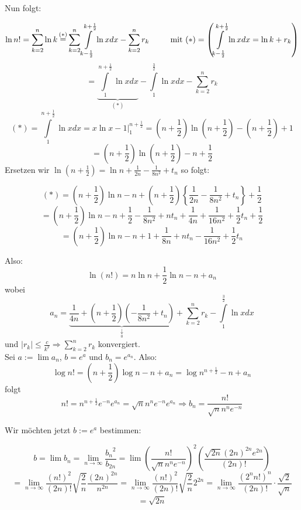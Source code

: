 Nun folgt:

\[\ln n! = \sum\limits_{k = 2}^n {\ln k\mathop  = \limits^{( * )} \sum\limits_{k = 2}^n {\int\limits_{k - \frac{1}{2}}^{k + \frac{1}{2}} {\ln xdx} }  - \sum\limits_{k = 2}^n {{r_k}} } \text{\hspace{8mm} mit }( * )=\left( {\int\limits_{k - \frac{1}{2}}^{k + \frac{1}{2}} {\ln xdx = \ln k + {r_k}} } \right) \]
\[ = \underbrace {\int\limits_1^{n + \frac{1}{2}} {\ln xdx} }_{( * )} - \int\limits_1^{\frac{3}{2}} {\ln xdx - \sum\limits_{k = 2}^n {{r_k}} } \]
\[( * ) = \int\limits_1^{n + \frac{1}{2}} {\ln xdx = \left. {x\ln x - 1} \right|_1^{n + \frac{1}{2}}}  = \left( {n + \frac{1}{2}} \right)\ln \left( {n + \frac{1}{2}} \right) - \left( {n + \frac{1}{2}} \right) + 1\]
\[ = \left( {n + \frac{1}{2}} \right)\ln \left( {n + \frac{1}{2}} \right) - n + \frac{1}{2}\]
Ersetzen wir $\ln \left( {n + \frac{1}{2}} \right) = \ln n + \frac{1}{{2n}} - \frac{1}{{8{n^2}}} + {t_n}$ so folgt:

\[(*) = \left( {n + \frac{1}{2}} \right)\ln n - n + \left( {n + \frac{1}{2}} \right)\left\{ {\frac{1}{{2n}} - \frac{1}{{8{n^2}}} + {t_n}} \right\} + \frac{1}{2}\]
\[ = \left( {n + \frac{1}{2}} \right)\ln n - n + \frac{1}{2} - \frac{1}{{8{n^2}}} + n{t_n} + \frac{1}{{4n}} + \frac{1}{{16{n^2}}} + \frac{1}{2}{t_n} + \frac{1}{2}\]
\[ = \left( {n + \frac{1}{2}} \right)\ln n - n + 1 + \frac{1}{{8n}} + n{t_n} - \frac{1}{{16{n^2}}} + \frac{1}{2}{t_n}\]

Also:
\[\ln (n!) = n\ln n + \frac{1}{2}\ln n - n + {a_n}\]
wobei
\[{a_n} = \underbrace {\frac{1}{{4n}} + \left( {n + \frac{1}{2}} \right)\left( { - \frac{1}{{8{n^2}}} + {t_n}} \right)}_{\mathop  \downarrow \limits_0 } + \sum\limits_{k = 2}^n {{r_k} - \int\limits_1^{\frac{3}{2}} {\ln xdx} } \]
und $\left| {{r_k}} \right| \le \frac{c}{{{k^2}}} \Rightarrow \sum\limits_{k = 2}^n {{r_k}} $ konvergiert.\\

\noindent Sei $a:=\lim a_n$, $b=e^a$ und $b_n=e^{a_n}$. Also:
\[\log n! = \left( {n + \frac{1}{2}} \right)\log n - n + {a_n} = \log {n^{n + \frac{1}{2}}} - n + {a_n}\]
folgt 
\[n! = {n^{n + \frac{1}{2}}}{e^{ - n}}{e^{{a_n}}} = \sqrt n {n^n}{e^{ - n}}{e^{{a_n}}} \Rightarrow {b_n} = \frac{{n!}}{{\sqrt n {n^n}{e^{ - n}}}}\]

\noindent Wir möchten jetzt $b:=e^a$ bestimmen:

\[b = \lim {b_n} = \mathop {\lim }\limits_{n \to \infty } \frac{{{b_n}^2}}{{{b_{2n}}}} = \lim {\left( {\frac{{n!}}{{\sqrt n {n^n}{e^{ - n}}}}} \right)^2}\left( {\frac{{\sqrt {2n} {{(2n)}^{2n}}{e^{2n}}}}{{(2n)!}}} \right)\]
\[ = \mathop {\lim }\limits_{n \to \infty } \frac{{{{(n!)}^2}}}{{(2n)!}}\sqrt {\frac{2}{n}} \frac{{{{(2n)}^{2n}}}}{{{n^{2n}}}} = \mathop {\lim }\limits_{n \to \infty } \frac{{{{(n!)}^2}}}{{(2n)!}}\sqrt {\frac{2}{n}} {2^{2n}} = \mathop {\lim }\limits_{n \to \infty } \frac{{{{({2^n}n!)}^n}}}{{(2n)!}} \cdot \frac{{\sqrt 2 }}{{\sqrt n }}\]
\[ = \sqrt {2n} \]

